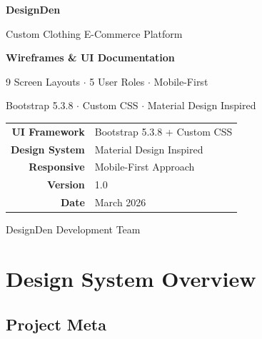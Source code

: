 \documentclass[a4paper,11pt]{article}
\begin{document}
\begin{titlepage}
  \centering
  \vspace*{2cm}
  {\Huge\bfseries\textcolor{primary}{DesignDen}\par}
  \vspace{0.4cm}
  {\large\textcolor{secondary}{Custom Clothing E-Commerce Platform}\par}
  \vspace{1.5cm}
  \begin{mdframed}[linecolor=primary,linewidth=2pt,innertopmargin=16pt,innerbottommargin=16pt]
    \centering
    {\LARGE\bfseries Wireframes \& UI Documentation}\par
    \vspace{0.3cm}
    {\normalsize 9 Screen Layouts $\cdot$ 5 User Roles $\cdot$ Mobile-First}\par
    \vspace{0.3cm}
    {\small Bootstrap 5.3.8 $\cdot$ Custom CSS $\cdot$ Material Design Inspired}
  \end{mdframed}
  \vspace{2cm}
  \begin{tabular}{rl}
    \textbf{UI Framework} & Bootstrap 5.3.8 + Custom CSS \\[4pt]
    \textbf{Design System}& Material Design Inspired     \\[4pt]
    \textbf{Responsive}   & Mobile-First Approach        \\[4pt]
    \textbf{Version}      & 1.0                          \\[4pt]
    \textbf{Date}         & March 2026                   \\
  \end{tabular}
  \vfill
  {\small\textcolor{muted}{DesignDen Development Team}}
\end{titlepage}

\tableofcontents
\newpage

\section{Design System Overview}

\subsection{Project Meta}
\end{document}

